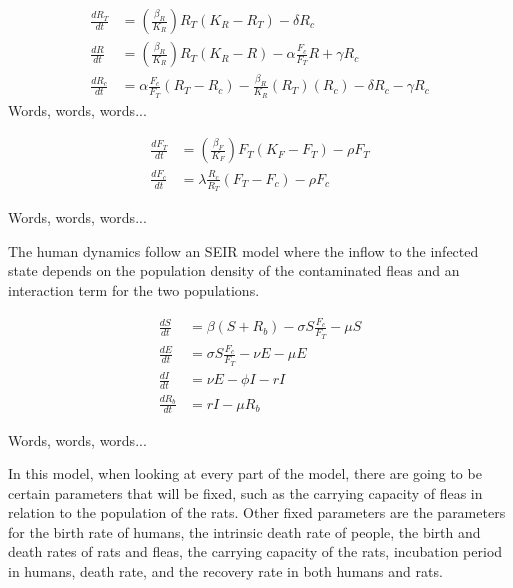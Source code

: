 \documentclass [letterpaper, 12pt] {article}
\begin{document}
\begin{align}
	\frac{dR_T}{dt} &= (\frac{\beta_R}{K_R})R_T(K_R-R_T)-\delta R_c \\
	\frac{dR}{dt} &= (\frac{\beta_R}{K_R})R_T(K_R-R)-\alpha \frac{F_c}{F_T}R+\gamma  R_c \\
	\frac{dR_c}{dt} &= \alpha \frac{F_c}{F_T} (R_T-R_c)-\frac{\beta_R}{K_R}(R_T)(R_c) - \delta R_c - \gamma R_c 
\end{align}
Words, words, words...


\begin{align}
	\frac{dF_T}{dt} &= (\frac{\beta_F}{K_F})F_T(K_F-F_T)-\rho F_T  \\
	\frac{dF_c}{dt} &= \lambda \frac{R_c}{R_T} (F_T-F_c) - \rho F_c 
\end{align}

Words, words, words...



The human dynamics follow an SEIR model where the inflow to the infected state depends on the
population density of the contaminated fleas and an interaction term for the two populations.

\begin{align}
	\frac{dS}{dt} &= \beta (S+R_b) - \sigma S \frac{F_c}{F_T} - \mu S \\
	\frac{dE}{dt} &= \sigma S \frac{F_c}{F_T} - \nu E - \mu E \\
	\frac{dI}{dt} &= \nu E - \phi I - rI \\
	\frac{dR_b}{dt} &= rI - \mu R_b
\end{align}

Words, words, words...



In this model, when looking at every part of the model, there are going to be certain parameters
that will be fixed, such as the carrying capacity of fleas in relation to the population of the rats.
Other fixed parameters are the parameters for the birth rate of humans, the intrinsic death rate of
people, the birth and death rates of rats and fleas, the carrying capacity of the rats, incubation period
in humans, death rate, and the recovery rate in both humans and rats.
\end{document}
